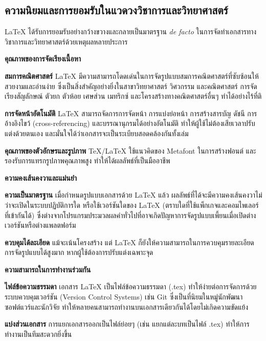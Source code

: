 \subsection{ความนิยมและการยอมรับในแวดวงวิชาการและวิทยาศาสตร์}
\hspace*{1.5em} %
LaTeX ได้รับการยอมรับอย่างกว้างขวางและกลายเป็นมาตรฐาน \textit{de facto} ในการจัดทำเอกสารทางวิชาการและวิทยาศาสตร์ด้วยเหตุผลหลายประการ

\hspace*{1.5em} %
\textbf{คุณภาพของการจัดเรียงเนื้อหา}
    \begin{mycustomitem}
        \item \textbf{สมการคณิตศาสตร์} LaTeX มีความสามารถโดดเด่นในการจัดรูปแบบสมการคณิตศาสตร์ที่ซับซ้อนให้สวยงามและอ่านง่าย ซึ่งเป็นสิ่งสำคัญอย่างยิ่งในสาขาวิทยาศาสตร์ วิศวกรรม และคณิตศาสตร์ การจัดเรียงสัญลักษณ์ ตัวยก ตัวห้อย เศษส่วน เมทริกซ์ และโครงสร้างทางคณิตศาสตร์อื่นๆ ทำได้อย่างไร้ที่ติ
        \item \textbf{การจัดหน้าอัตโนมัติ} LaTeX สามารถจัดการการจัดหน้า การแบ่งย่อหน้า การสร้างสารบัญ ดัชนี การอ้างอิงไขว้ (cross-referencing) และบรรณานุกรมได้อย่างอัตโนมัติ ทำให้ผู้ใช้ไม่ต้องเสียเวลาปรับแต่งด้วยตนเอง และมั่นใจได้ว่าเอกสารจะเป็นระเบียบสอดคล้องกันทั้งเล่ม
        \item \textbf{คุณภาพของตัวอักษรและรูปภาพ} TeX/LaTeX ใช้แนวคิดของ Metafont ในการสร้างฟอนต์ และรองรับการแทรกรูปภาพคุณภาพสูง ทำให้ได้ผลลัพธ์ที่เป็นมืออาชีพ
    \end{mycustomitem}
    
\hspace*{1.5em} %
\textbf{ความคงเส้นคงวาและแม่นยำ}
    \begin{mycustomitem}
        \item \textbf{ความเป็นมาตรฐาน} เมื่อกำหนดรูปแบบเอกสารด้วย LaTeX แล้ว ผลลัพธ์ที่ได้จะมีความคงเส้นคงวาไม่ว่าจะเปิดในระบบปฏิบัติการใด หรือใช้เวอร์ชันใดของ LaTeX (ตราบใดที่ใช้แพ็กเกจและคอมไพเลอร์ที่เข้ากันได้) ซึ่งต่างจากโปรแกรมประมวลผลคำทั่วไปที่อาจเกิดปัญหาการจัดรูปแบบเพี้ยนเมื่อเปิดต่างเวอร์ชันหรือต่างแพลตฟอร์ม
        \item \textbf{ควบคุมได้ละเอียด} แม้จะเน้นโครงสร้าง แต่ LaTeX ก็ยังให้ความสามารถในการควบคุมรายละเอียดการจัดรูปแบบได้สูงมาก หากผู้ใช้ต้องการปรับแต่งเฉพาะจุด
    \end{mycustomitem}

\hspace*{1.5em} %
\textbf{ความสามารถในการทำงานร่วมกัน}
    \begin{mycustomitem}
        \item \textbf{ไฟล์ข้อความธรรมดา} เอกสาร LaTeX เป็นไฟล์ข้อความธรรมดา (.tex) ทำให้ง่ายต่อการจัดการด้วยระบบควบคุมเวอร์ชัน (Version Control Systems) เช่น Git ซึ่งเป็นที่นิยมในหมู่นักพัฒนาซอฟต์แวร์และนักวิจัย ทำให้หลายคนสามารถทำงานบนเอกสารเดียวกันได้โดยไม่เกิดความขัดแย้ง
        \item \textbf{แบ่งส่วนเอกสาร} การแยกเอกสารออกเป็นไฟล์ย่อยๆ (เช่น แยกแต่ละบทเป็นไฟล์ .tex) ทำให้การทำงานเป็นทีมสะดวกยิ่งขึ้น
    \end{mycustomitem}

